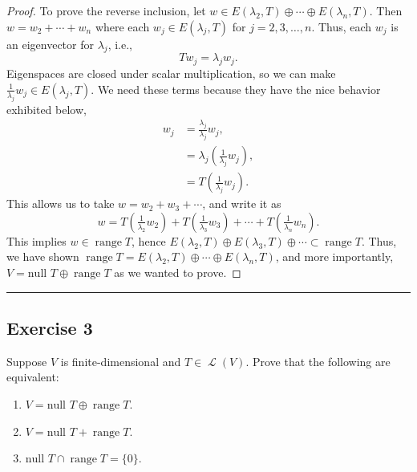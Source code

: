 \documentclass[letterpaper, 12pt]{amsart}
\DeclareMathOperator{\Ell}{\mathscr{L}}				%
\renewcommand{\null}{\text{null }}					%
\DeclareMathOperator{\range}{\text{range }}			%
\theoremstyle{definition}  							%
\begin{document}
\begin{proof}
		To prove the reverse inclusion, let $w \in E(\lambda_{2},T) \oplus \cdots \oplus E(\lambda_{n}, T)$.
		Then $w = w_{2} + \cdots + w_{n}$ where each $w_{j} \in E(\lambda_{j},T)$ for $j = 2,3,\dots,n$.
		Thus, each $w_{j}$ is an eigenvector for $\lambda_{j}$, i.e., $$Tw_{j} = \lambda_{j}w_{j}.$$
		Eigenspaces are closed under scalar multiplication, so we can make $\tfrac{1}{\lambda_{j}}w_{j} \in E(\lambda_{j},T)$.
		We need these terms because they have the nice behavior exhibited below,
			\begin{align*}
				w_{j} &= \frac{\lambda_{j}}{\lambda_{j}} w_{j}, \\
				&= \lambda_{j}\left(\tfrac{1}{\lambda_{j}} w_{j} \right), \\
				&= T\left(\tfrac{1}{\lambda_{j}} w_{j} \right).
			\end{align*}
		This allows us to take $w = w_{2} + w_{3} + \cdots$, and write it as $$w = T\left(\tfrac{1}{\lambda_{2}} w_{2}\right) + T\left(\tfrac{1}{\lambda_{3}} w_{3}\right) + \cdots + T\left(\tfrac{1}{\lambda_{n}} w_{n}\right).$$
		This implies $w \in \range T$, hence $E(\lambda_{2},T) \oplus E(\lambda_{3}, T) \oplus \cdots \subset \range T$.
		Thus, we have shown $\range T = E(\lambda_{2},T) \oplus \cdots \oplus E(\lambda_{n}, T)$, and more importantly, $V = \null T \oplus \range T$ as we wanted to prove.
		\end{proof}
		\vspace*{2mm}
		\hrule
		\vspace*{2mm}

		\subsection*{Exercise 3}
		Suppose $V$ is finite-dimensional and $T \in \Ell(V)$. 
		Prove that the following are equivalent:
			\begin{enumerate}[\hspace*{5mm}(a)]
				\item $V = \null T \oplus \range T$.
				\item $V = \null T + \range T$.
				\item $\null T \cap \range T = \{0\}$.
			\end{enumerate}
		\vspace*{3mm}
\end{document}
